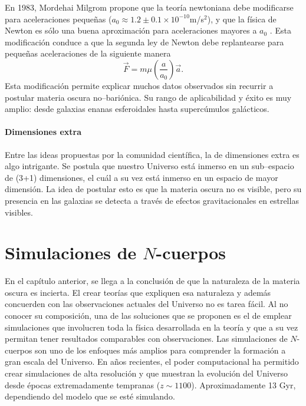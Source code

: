\documentclass[a4paper,openright,12pt]{book}
\begin{document}
En 1983, Mordehai Milgrom propone que la teoría newtoniana debe modificarse para aceleraciones pequeñas ($a_{0} \approx 1.2 \pm 0.1 \times 10^{-10}$m/s$^{2}$), y que la física de Newton es sólo una buena aproximación para aceleraciones mayores a $a_{0}$ \cite{1.3.8}. Esta modificación conduce a que la segunda ley de Newton debe replantearse para pequeñas aceleraciones de la siguiente manera 
\begin{equation}
\vec{F} = m \mu (\frac{a}{a_{0}})\vec{a}.\label{eqn 1.79}
\end{equation}
Esta modificación permite explicar muchos datos observados sin recurrir a postular materia oscura no--bariónica. Su rango de aplicabilidad y éxito es muy amplio: desde galaxias enanas esferoidales hasta supercúmulos galácticos.

\subsubsection*{Dimensiones extra}

Entre las ideas propuestas por la comunidad científica, la de dimensiones extra es algo intrigante. Se postula que nuestro Universo está inmerso en un sub--espacio de (3+1) dimensiones, el cuál a su vez está inmerso en un espacio de mayor dimensión. La idea de postular esto es que la materia oscura no es visible, pero su presencia en las galaxias se detecta a través de efectos gravitacionales en estrellas visibles.





\chapter{Simulaciones de $N$-cuerpos}\label{cap.nudo}
En el capítulo anterior, se llega a la conclusión de que la naturaleza de la materia oscura es incierta. El crear teorías que expliquen esa naturaleza y además concuerden con las observaciones actuales del Universo no es tarea fácil. Al no conocer su composición, una de las soluciones que se proponen es el de emplear simulaciones que involucren toda la física desarrollada en la teoría y que a su vez permitan tener resultados comparables con observaciones. Las simulaciones de $N$-cuerpos son uno de los enfoques más amplios para comprender la formación a gran escala del Universo. En años recientes, el poder computacional ha permitido crear simulaciones de alta resolución y que muestran la evolución del Universo desde épocas extremadamente tempranas ($z \sim 1100$). Aproximadamente 13 Gyr, dependiendo del modelo que se esté simulando.
\end{document}

